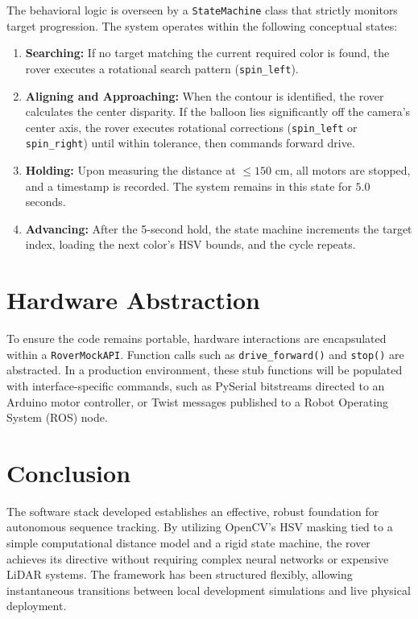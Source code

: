 \documentclass[12pt,a4paper]{article}
\begin{document}
The behavioral logic is overseen by a \texttt{StateMachine} class that strictly monitors target progression. 
The system operates within the following conceptual states:
\begin{enumerate}
    \item \textbf{Searching:} If no target matching the current required color is found, the rover executes a rotational search pattern (\texttt{spin\_left}).
    \item \textbf{Aligning and Approaching:} When the contour is identified, the rover calculates the center disparity. If the balloon lies significantly off the camera's center axis, the rover executes rotational corrections (\texttt{spin\_left} or \texttt{spin\_right}) until within tolerance, then commands forward drive.
    \item \textbf{Holding:} Upon measuring the distance at $\leq 150$ cm, all motors are stopped, and a timestamp is recorded. The system remains in this state for $5.0$ seconds.
    \item \textbf{Advancing:} After the 5-second hold, the state machine increments the target index, loading the next color's HSV bounds, and the cycle repeats.
\end{enumerate}

\section{Hardware Abstraction}

To ensure the code remains portable, hardware interactions are encapsulated within a \texttt{RoverMockAPI}. Function calls such as \texttt{drive\_forward()} and \texttt{stop()} are abstracted. In a production environment, these stub functions will be populated with interface-specific commands, such as PySerial bitstreams directed to an Arduino motor controller, or Twist messages published to a Robot Operating System (ROS) node.

\section{Conclusion}
The software stack developed establishes an effective, robust foundation for autonomous sequence tracking. By utilizing OpenCV's HSV masking tied to a simple computational distance model and a rigid state machine, the rover achieves its directive without requiring complex neural networks or expensive LiDAR systems. The framework has been structured flexibly, allowing instantaneous transitions between local development simulations and live physical deployment.
\end{document}
